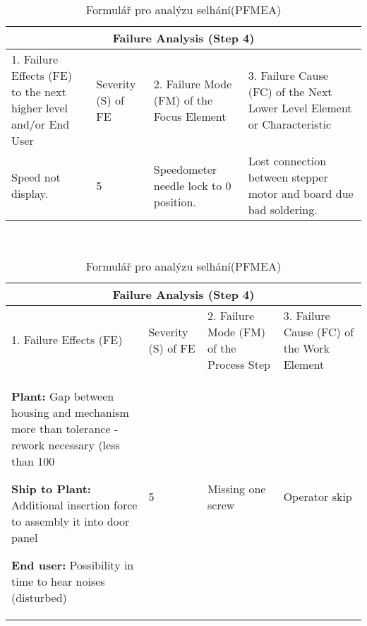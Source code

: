 \begin{center}
\begin{table}[htp]
	\centering
	\caption{Formulář pro analýzu selhání(DFMEA) }
	\label{tab:failure_DFMEA}
\begin{tabular}{ |p{4cm}|p{0.5cm}|p{3cm}|p{4cm}|  }
 \hline
 \multicolumn{4}{|c|}{Failure Analysis (Step 4)} \\
 \hline
  1. Failure Effects (FE) to the next higher level and/or End User&
  \begin{turn}{-90}Severity (S) of FE\end{turn} &
2. Failure Mode (FM) of the Focus Element &
3. Failure Cause (FC) of the Next Lower Level Element or Characteristic
\\
 \hline
 Speed not display.
  & 5
  & Speedometer needle lock to 0 position. & Lost connection between stepper motor and board due bad soldering.
\\
 \hline
\end{tabular}\  
\\
\hfill \break
\hfill \break
\centering
	\caption{Formulář pro analýzu selhání(PFMEA) }
	\label{tab:failure_PFMEA}
\begin{tabular}{ |p{4cm}|p{0.5cm}|p{3cm}|p{4cm}|  }
 \hline
 \multicolumn{4}{|c|}{Failure Analysis (Step 4)} \\
 \hline
  1. Failure Effects (FE)
&
  \begin{turn}{-90}Severity (S) of FE\end{turn} &
2. Failure Mode (FM) of the Process Step
 &
3. Failure Cause (FC) of the Work Element

\\
 \hline
\textbf{Plant:}
Gap between housing and mechanism more than tolerance - rework necessary (less than 100%

\textbf{Ship to Plant:}
Additional insertion force to assembly it into door panel

\textbf{End user:}
Possibility in time to hear noises (disturbed)

  & 5
  & Missing one screw
 & Operator skip

\\
 \hline
\end{tabular}\  
\end{table}
\end{center}



